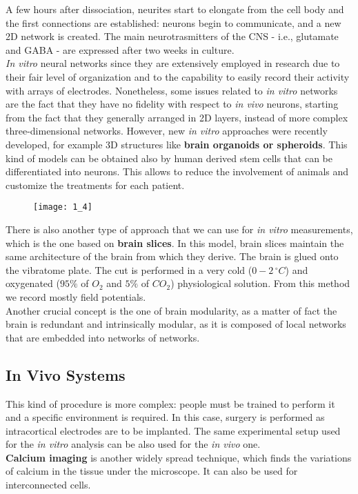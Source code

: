 A few hours after dissociation, neurites start to elongate from the cell
body and the first connections are established: neurons begin to
communicate, and a new 2D network is created.
The main neurotrasmitters of the CNS - i.e., glutamate and GABA - are
expressed after two weeks in culture.\\
\textit{In vitro} neural networks since they are extensively employed in research
due to their fair level of organization and to the capability to easily
record their activity with arrays of electrodes. Nonetheless, some issues
related to
\textit{in vitro} networks are the fact that they have no fidelity with
respect to \textit{in vivo} neurons, starting from the fact that they
generally arranged in 2D layers, instead of more complex three-dimensional
networks.
However, new \textit{in vitro} approaches were recently developed, for example 3D
structures like \textbf{brain organoids or spheroids}. This kind of models
can be obtained also by human derived stem cells that can be
differentiated into neurons. This allows to reduce the involvement of
animals and customize the treatments for each patient.
\begin{figure}[H]
      \texttt{[image: 1\_4]}
      \centering
\end{figure}
There is also another type of approach that we can use for \textit{in vitro}
measurements, which is the one based on \textbf{brain slices}. In this
model, brain slices maintain the same architecture of the brain from which
they derive. The brain is glued onto the vibratome plate. The cut is
performed in a very cold (\(0-2\,{}^{\circ}C\)) and oxygenated (\(95\%\) of \(O_2\)
and \(5\%\) of \(CO_2\)) physiological solution.
From this method we record mostly field potentials.\\
Another crucial concept is the one of brain modularity, as a matter of
fact the brain is redundant and intrinsically modular, as it is composed of
local networks that are embedded into networks of networks.\\

\subsection{In Vivo Systems}
This kind of procedure is more complex: people must be trained to perform
it and a specific environment is required. In this case, surgery is performed as
intracortical electrodes are to be implanted. The same experimental
setup used for the \textit{in vitro} analysis can be also used for the \textit{in vivo}
one.\\
\textbf{Calcium imaging} is another widely spread technique, which finds the
variations of calcium in the tissue under the microscope. It can also be used
for interconnected cells.

